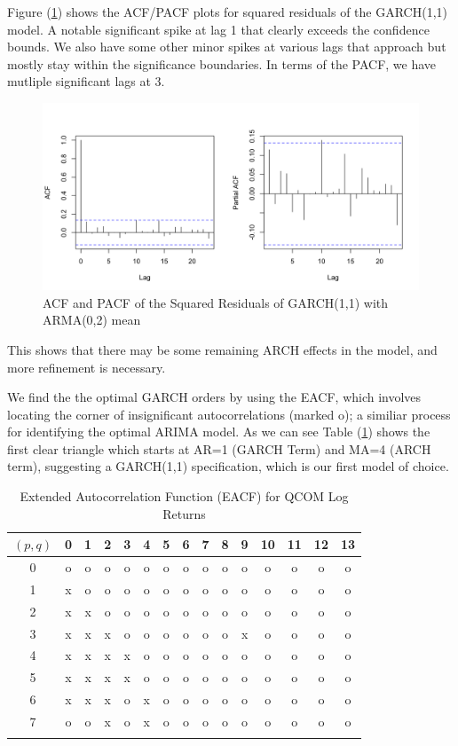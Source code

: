 Figure (\ref{fig:acf_pacf_squared_resid}) shows the ACF/PACF plots for squared residuals of the GARCH(1,1) model. A notable significant spike at lag 1 that clearly exceeds the confidence bounds. We also have some other minor spikes at various lags that approach but mostly stay within the significance boundaries. In terms of the PACF, we have mutliple significant lags at 3. 

\begin{figure}[!h]
	\centering
	\includegraphics[width=0.85\linewidth]{content/plots/acf_pacf_squared_resid.png}
	\caption{ACF and PACF of the Squared Residuals of GARCH(1,1) with ARMA(0,2) mean}
	\label{fig:acf_pacf_squared_resid}
\end{figure}

This shows that there may be some remaining ARCH effects in the model, and more refinement is necessary.

We find the the optimal GARCH orders by using the EACF, which involves  locating the corner of insignificant autocorrelations (marked o); a similiar process for identifying the optimal ARIMA model. As we can see Table (\ref{tab:eacf_garch}) shows the first clear triangle which starts at AR=1 (GARCH Term) and MA=4 (ARCH term), suggesting a GARCH(1,1) specification, which is our first model of choice.

\begin{table}[H]
	\centering
	\caption{Extended Autocorrelation Function (EACF) for QCOM Log Returns}
	\begin{tabular}{c|cccccccccccccc}
		$(p, q)$ & 0 & 1 & 2 & 3 & 4 & 5 & 6 & 7 & 8 & 9 & 10 & 11 & 12 & 13 \\
		\hline
0 & o & o & o & o & o & o & o & o & o & o & o & o & o & o \\
1 & x & o & o & o & o & o & o & o & o & o & o & o & o & o \\
2 & x & x & o & o & o & o & o & o & o & o & o & o & o & o \\
3 & x & x & x & o & o & o & o & o & o & x & o & o & o & o \\
4 & x & x & x & x & o & o & o & o & o & o & o & o & o & o \\
5 & x & x & x & x & o & o & o & o & o & o & o & o & o & o \\
6 & x & x & x & o & x & o & o & o & o & o & o & o & o & o \\
7 & o & o & x & o & x & o & o & o & o & o & o & o & o & o \\
		\label{tab:eacf_garch}
	\end{tabular}
\end{table}


